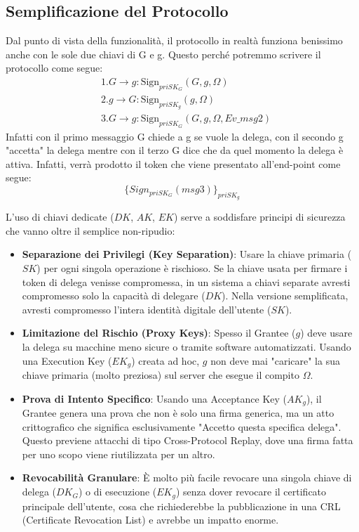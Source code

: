 \subsection{Semplificazione del Protocollo}
Dal punto di vista della funzionalità, il protocollo in realtà funziona benissimo anche con le sole due chiavi di G e g. Questo perché potremmo scrivere il protocollo come segue:
\begin{align*}
    &1. G \to g: \text{Sign}_{priSK_G}(G, g, \Omega)\\
    &2. g \to G: \text{Sign}_{priSK_g}(g, \Omega)\\
    &3. G \to g: \text{Sign}_{priSK_G}(G, g, \Omega, Ev\_msg2)
\end{align*}
Infatti con il primo messaggio G chiede a g se vuole la delega, con il secondo g "accetta" la delega mentre con il terzo G dice che da quel momento la delega è attiva. Infatti, verrà prodotto il token che viene presentato all'end-point come segue:
\[\{Sign_{priSK_G}(msg3)\}_{priSK_g}\]

L'uso di chiavi dedicate ($DK$, $AK$, $EK$) serve a soddisfare principi di sicurezza che vanno oltre il semplice non-ripudio:
\begin{itemize}
    \item \textbf{Separazione dei Privilegi (Key Separation)}: Usare la chiave primaria ($SK$) per ogni singola operazione è rischioso. Se la chiave usata per firmare i token di delega venisse compromessa, in un sistema a chiavi separate avresti compromesso solo la capacità di delegare ($DK$). Nella versione semplificata, avresti compromesso l'intera identità digitale dell'utente ($SK$).
    \item \textbf{Limitazione del Rischio (Proxy Keys)}: Spesso il Grantee ($g$) deve usare la delega su macchine meno sicure o tramite software automatizzati. Usando una Execution Key ($EK_g$) creata ad hoc, $g$ non deve mai "caricare" la sua chiave primaria (molto preziosa) sul server che esegue il compito $\Omega$.
    \item \textbf{Prova di Intento Specifico}: Usando una Acceptance Key ($AK_g$), il Grantee genera una prova che non è solo una firma generica, ma un atto crittografico che significa esclusivamente "Accetto questa specifica delega". Questo previene attacchi di tipo Cross-Protocol Replay, dove una firma fatta per uno scopo viene riutilizzata per un altro.
    \item \textbf{Revocabilità Granulare}: È molto più facile revocare una singola chiave di delega ($DK_G$) o di esecuzione ($EK_g$) senza dover revocare il certificato principale dell'utente, cosa che richiederebbe la pubblicazione in una CRL (Certificate Revocation List) e avrebbe un impatto enorme.
\end{itemize}
